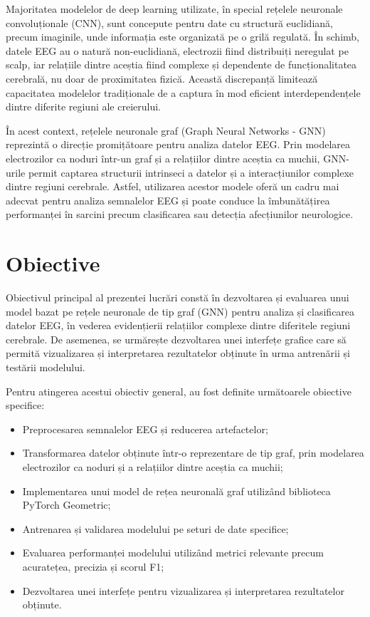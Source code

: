 \documentclass[12pt,a4paper]{report}
\theoremstyle{definition}
\theoremstyle{remark}
\begin{document}
Majoritatea modelelor de deep learning utilizate, în special rețelele neuronale convoluționale (CNN), sunt concepute pentru date cu structură euclidiană, precum imaginile, unde informația este organizată pe o grilă regulată. În schimb, datele EEG au o natură non-euclidiană, electrozii fiind distribuiți neregulat pe scalp, iar relațiile dintre aceștia fiind complexe și dependente de funcționalitatea cerebrală, nu doar de proximitatea fizică. Această discrepanță limitează capacitatea modelelor tradiționale de a captura în mod eficient interdependențele dintre diferite regiuni ale creierului.

În acest context, rețelele neuronale graf (Graph Neural Networks - GNN) reprezintă o direcție promițătoare pentru analiza datelor EEG. Prin modelarea electrozilor ca noduri într-un graf și a relațiilor dintre aceștia ca muchii, GNN-urile permit captarea structurii intrinseci a datelor și a interacțiunilor complexe dintre regiuni cerebrale. Astfel, utilizarea acestor modele oferă un cadru mai adecvat pentru analiza semnalelor EEG și poate conduce la îmbunătățirea performanței în sarcini precum clasificarea sau detecția afecțiunilor neurologice.

\section{Obiective}

Obiectivul principal al prezentei lucrări constă în dezvoltarea și evaluarea unui model bazat pe rețele neuronale de tip graf (GNN) pentru analiza și clasificarea datelor EEG, în vederea evidențierii relațiilor complexe dintre diferitele regiuni cerebrale. De asemenea, se urmărește dezvoltarea unei interfețe grafice care să permită vizualizarea și interpretarea rezultatelor obținute în urma antrenării și testării modelului.

Pentru atingerea acestui obiectiv general, au fost definite următoarele obiective specifice:
\begin{itemize}
    \item Preprocesarea semnalelor EEG și reducerea artefactelor;
    \item Transformarea datelor obținute într-o reprezentare de tip graf, prin modelarea electrozilor ca noduri și a relațiilor dintre aceștia ca muchii;
    \item Implementarea unui model de rețea neuronală graf utilizând biblioteca PyTorch Geometric;
    \item Antrenarea și validarea modelului pe seturi de date specifice;
    \item Evaluarea performanței modelului utilizând metrici relevante precum acuratețea, precizia și scorul F1;
    \item Dezvoltarea unei interfețe pentru vizualizarea și interpretarea rezultatelor obținute.
\end{itemize}
\end{document}
